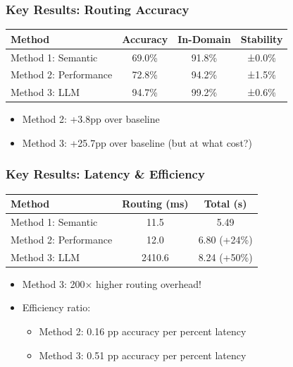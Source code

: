 \documentclass{beamer}
\begin{document}
\begin{frame}
\frametitle{Key Results: Routing Accuracy}
\begin{center}
\begin{tabular}{lccc}
\toprule
\textbf{Method} & \textbf{Accuracy} & \textbf{In-Domain} & \textbf{Stability} \\
\midrule
Method 1: Semantic & 69.0\% & 91.8\% & ±0.0\% \\
Method 2: Performance & 72.8\% & 94.2\% & ±1.5\% \\
Method 3: LLM & 94.7\% & 99.2\% & ±0.6\% \\
\bottomrule
\end{tabular}
\end{center}

\vspace{0.3cm}

\begin{itemize}
    \item Method 2: +3.8pp over baseline
    \item Method 3: +25.7pp over baseline (but at what cost?)
\end{itemize}
\end{frame}

\begin{frame}
\frametitle{Key Results: Latency \& Efficiency}
\begin{center}
\begin{tabular}{lcc}
\toprule
\textbf{Method} & \textbf{Routing (ms)} & \textbf{Total (s)} \\
\midrule
Method 1: Semantic & 11.5 & 5.49 \\
Method 2: Performance & 12.0 & 6.80 (+24\%) \\
Method 3: LLM & 2410.6 & 8.24 (+50\%) \\
\bottomrule
\end{tabular}
\end{center}

\vspace{0.3cm}

\begin{itemize}
    \item Method 3: 200× higher routing overhead!
    \pause
    \item Efficiency ratio:
    \begin{itemize}
        \item Method 2: 0.16 pp accuracy per percent latency
        \item Method 3: 0.51 pp accuracy per percent latency
    \end{itemize}
\end{itemize}
\end{frame}
\end{document}
